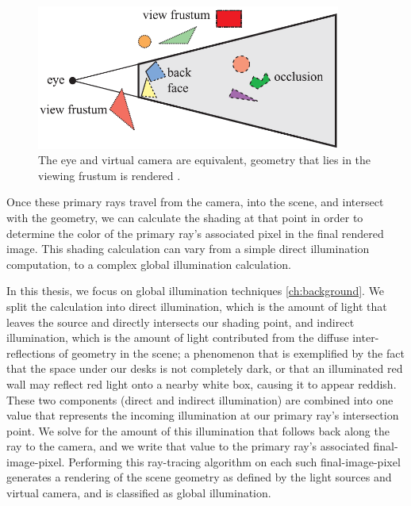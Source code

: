 \begin{figure}[h!]
    \centering
    \includegraphics[width=100mm]{../img/RTR3_14_09_camera.png}
    \caption[Virtual camera, frustum, and geometry]{The eye and virtual camera are equivalent, geometry that lies in the viewing frustum is rendered \cite{bib:rtr}.}
    \label{fig:camera}
\end{figure}

Once these primary rays travel from the camera, into the scene, and intersect with the geometry, we can calculate the shading at that point in order to determine the color of the primary ray's associated pixel in the final rendered image. This shading calculation can vary from a simple direct illumination computation, to a complex global illumination calculation.

In this thesis, we focus on global illumination techniques \ref{ch:background}. We split the calculation into direct illumination, which is the amount of light that leaves the source and directly intersects our shading point, and indirect illumination, which is the amount of light contributed from the diffuse inter-reflections of geometry in the scene; a phenomenon that is exemplified by the fact that the space under our desks is not completely dark, or that an illuminated red wall may reflect red light onto a nearby white box, causing it to appear reddish. These two components (direct and indirect illumination) are combined into one value that represents the incoming illumination at our primary ray's intersection point. We solve for the amount of this illumination that follows back along the ray to the camera, and we write that value to the primary ray's associated final-image-pixel. Performing this ray-tracing algorithm on each such final-image-pixel generates a rendering of the scene geometry as defined by the light sources and virtual camera, and is classified as global illumination.

